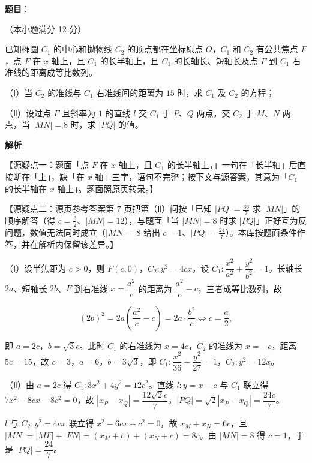 \begin{answer}

\textbf{题目}：

（本小题满分 12 分）

已知椭圆 $C_1$ 的中心和抛物线 $C_2$ 的顶点都在坐标原点 $O$，$C_1$ 和 $C_2$ 有公共焦点 $F$，点 $F$ 在 $x$ 轴上，且 $C_1$ 的长半轴上，且 $C_1$ 的长轴长、短轴长及点 $F$ 到 $C_1$ 右准线的距离成等比数列。

（Ⅰ）当 $C_2$ 的准线与 $C_1$ 右准线间的距离为 $15$ 时，求 $C_1$ 及 $C_2$ 的方程；

（Ⅱ）设过点 $F$ 且斜率为 $1$ 的直线 $l$ 交 $C_1$ 于 $P$、$Q$ 两点，交 $C_2$ 于 $M$、$N$ 两点，当 $|MN|=8$ 时，求 $|PQ|$ 的值。

\textbf{解析}

【源疑点一：题面「点 $F$ 在 $x$ 轴上，且 $C_1$ 的长半轴上，」一句在「长半轴」后直接断在「上」，缺「在 $x$ 轴」三字，语句不完整；按下文与源答案，其意为「$C_1$ 的长半轴在 $x$ 轴上」。题面照原页转录。】

【源疑点二：源页参考答案第 7 页把第（Ⅱ）问按「已知 $|PQ|=\frac{36}7$ 求 $|MN|$」的顺序解答（得 $c=\frac32$、$|MN|=12$），与题面「当 $|MN|=8$ 时求 $|PQ|$」正好互为反问题，数值无法同时成立（$|MN|=8$ 给出 $c=1$、$|PQ|=\frac{24}7$）。本库按题面条件作答，并在解析内保留该差异。】

（Ⅰ）设半焦距为 $c>0$，则 $F(c,0)$，$C_2:y^2=4cx$。设 $C_1:\dfrac{x^2}{a^2}+\dfrac{y^2}{b^2}=1$。长轴长 $2a$、短轴长 $2b$、$F$ 到右准线 $x=\dfrac{a^2}c$ 的距离为 $\dfrac{a^2}c-c$，三者成等比数列，故

\nopagebreak[4]
\[(2b)^2=2a\left(\frac{a^2}c-c\right)=2a\cdot\frac{b^2}c\iff c=\frac a2,\]

即 $a=2c$，$b=\sqrt3c$。此时 $C_1$ 的右准线为 $x=4c$，$C_2$ 的准线为 $x=-c$，距离 $5c=15$，故 $c=3$，$a=6$，$b=3\sqrt3$，即 $C_1:\dfrac{x^2}{36}+\dfrac{y^2}{27}=1$，$C_2:y^2=12x$。

（Ⅱ）由 $a=2c$ 得 $C_1:3x^2+4y^2=12c^2$。直线 $l:y=x-c$ 与 $C_1$ 联立得 $7x^2-8cx-8c^2=0$，故 $|x_P-x_Q|=\dfrac{12\sqrt2c}7$，$|PQ|=\sqrt2|x_P-x_Q|=\dfrac{24c}7$。

$l$ 与 $C_2:y^2=4cx$ 联立得 $x^2-6cx+c^2=0$，故 $x_M+x_N=6c$，且 $|MN|=|MF|+|FN|=(x_M+c)+(x_N+c)=8c$。由 $|MN|=8$ 得 $c=1$，于是 $|PQ|=\dfrac{24}7$。


\end{answer}
